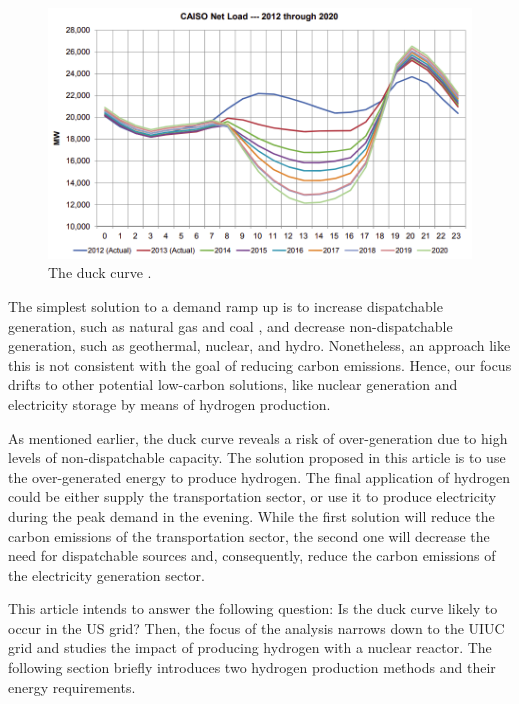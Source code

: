 \documentclass{anstrans}
\begin{document}
\begin{figure}[htbp!]
	\centering
	\includegraphics[width=1.0\linewidth]{figures/caiso-duck.png}
	\hfill
	\caption{The duck curve \cite{bouillon_prepared_2014}.}
	\label{fig:duck}
\end{figure}

The simplest solution to a demand ramp up is to increase dispatchable generation, such as natural gas and coal \cite{bouillon_prepared_2014}, and decrease non-dispatchable generation, such as geothermal, nuclear, and hydro.
Nonetheless, an approach like this is not consistent with the goal of reducing carbon emissions.
Hence, our focus drifts to other potential low-carbon solutions, like nuclear generation and electricity storage by means of hydrogen production.

As mentioned earlier, the duck curve reveals a risk of over-generation due to high levels of non-dispatchable capacity.
The solution proposed in this article is to use the over-generated energy to produce hydrogen.
The final application of hydrogen could be either supply the transportation sector, or use it to produce electricity during the peak demand in the evening.
While the first solution will reduce the carbon emissions of the transportation sector, the second one will decrease the need for dispatchable sources and, consequently, reduce the carbon emissions of the electricity generation sector.

This article intends to answer the following question: Is the duck curve likely to occur in the \gls{US} grid?
Then, the focus of the analysis narrows down to the \gls{UIUC} grid and studies the impact of producing hydrogen with a nuclear reactor.
The following section briefly introduces two hydrogen production methods and their energy requirements.
\end{document}
